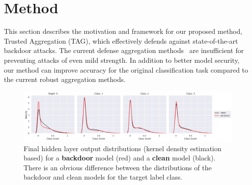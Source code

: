 \documentclass{article} %
\newtheorem{definition}{Definition}
\begin{document}



%
\vspace{-10pt}
\section{Method}
\vspace{-10pt}

This section describes the motivation and framework for our proposed method, Trusted Aggregation (TAG), which effectively defends against state-of-the-art backdoor attacks. The current defense aggregation methods~\citep{fedavg,trim-mean} are insufficient for preventing attacks of even mild strength. In addition to better model security, our method can improve accuracy for the original classification task compared to the current robust aggregation methods.

\begin{figure}[htp]
    \centering
    \includegraphics[width=\textwidth]{pics/ext_motivation.png}
    \caption{\footnotesize Final hidden layer output distributions (kernel density estimation based) for a {\color{red}\bf backdoor} model (red) and a {\bf clean} model (black). There is an obvious difference between the distributions of the backdoor and clean models for the target label class.}
    \label{fig: motivation}
\end{figure}
\end{document}
